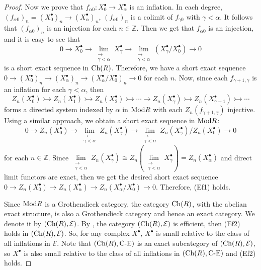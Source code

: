 \documentclass[reqno,12pt]{amsart}
\numberwithin{equation}{section}
\def\Ch{\mbox{\rm Ch}}
\theoremstyle{plain}
\theoremstyle{definition}
\begin{document}
\begin{proof}
    Now we prove that $f_{\alpha 0}: X_{0}^{\bullet}\to X_{\alpha}^{\bullet}$ is an inflation.
    In each degree, $(f_{\alpha 0})_{n}=
    (X_0^{\bullet})_n\to (X_{\alpha}^{\bullet})_n$, $(f_{\alpha 0})_{n}$ is
    a colimit of $f_{\gamma 0}$ with $\gamma<\alpha$. It follows that $(f_{\alpha 0})_n$ is an
    injection for each $n\in\mathbb{Z}$. Then we get that $f_{\alpha 0}$ is an injection, and
    it is easy to see that
    $$0\to X_{0}^{\bullet}
    \to\lim\limits_{\substack{\longrightarrow \\ \gamma<\alpha}}X_{\gamma}^{\bullet}
    \to\lim\limits_{\substack{\longrightarrow \\ \gamma<\alpha}}
    (X_{\gamma}^{\bullet}/X_{0}^{\bullet})\to 0$$ is a short exact sequence in $\Ch (R)$.
    Therefore, we have a short exact sequence $0\to (X^{\bullet}_{0})_n \to
    (X^{\bullet}_{\alpha})_n \to (X^{\bullet}_{\alpha}/X_{0}^{\bullet})_n \to 0$ for each $n$.
    Now, since each $f_{\gamma+1,\gamma}$ is an inflation for each $\gamma<\alpha$,
    then $$Z_n(X^{\bullet}_0)\rightarrowtail Z_n(X^{\bullet}_1)\rightarrowtail
    Z_n(X^{\bullet}_2)\rightarrowtail \cdots \to Z_n(X_{\gamma}^{\bullet})\rightarrowtail
    Z_n(X^{\bullet}_{\gamma+1})\rightarrowtail\cdots$$ forms a directed system indexed by
    $\alpha$ in $\mbox{\rm Mod} R$ with each $Z_n(f_{\gamma+1,\gamma})$ injective.
    Using a similar approach, we obtain a short exact sequence in $\mbox{\rm Mod} R$:
    $$0\to Z_n(X_0^{\bullet})\to\lim\limits_{\substack{\longrightarrow \\ \gamma<\alpha}}
    Z_n(X_{\gamma}^{\bullet})\to\lim\limits_{\substack{\longrightarrow \\ \gamma<\alpha}}
    Z_n(X_{\gamma}^{\bullet})/Z_n(X_{0}^{\bullet})\to 0$$
    for each $n\in\mathbb{Z}$.
    Since $\lim\limits_{\substack{\longrightarrow \\ \gamma<\alpha}}Z_n(X_{\gamma}^{\bullet})
    \cong Z_n(\lim\limits_{\substack{\longrightarrow \\ \gamma<\alpha}}X_{\gamma}^{\bullet})=
    Z_n(X_{\alpha}^{\bullet})$ and direct limit functors are exact, then we
    get the desired short exact sequence
    $0\to Z_n(X_0^{\bullet})\to Z_n(X_{\alpha}^{\bullet})\to
    Z_n(X_{\alpha}^{\bullet}/X_0^{\bullet})\to 0$.
    Therefore, {\rm (Ef1)} holds.

    Since $\mbox{\rm Mod} R$ is a Grothendieck category, the category $\Ch (R)$, with
    the abelian exact structure, is also a Grothendieck category and hence an
    exact category. We denote it by $(\Ch (R), \mathcal{E})$.
    By \cite[Proposition 3.13]{S13}, the category $(\Ch(R),\mathcal{E})$ is
    efficient, then {\rm (Ef2)} holds in $(\Ch (R),\mathcal{E})$. So, for any
    complex $X^{\bullet}$, $X^{\bullet}$ is small relative to the class of all
    inflations in $\mathcal{E}$. Note that $(\Ch(R),\text{C-E})$ is an exact
    subcategory of $(\Ch (R), \mathcal{E})$, so $X^{\bullet}$ is also small
    relative to the class of all inflations in $(\Ch(R),\text{C-E})$ and
    ({\rm Ef2}) holds.


\end{proof}
\end{document}
